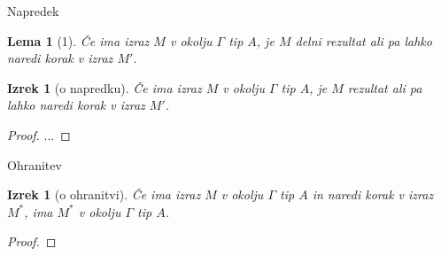 \documentclass{beamer}
\theoremstyle{definition} %
\theoremstyle{plain} %
\newtheorem{lema}[definicija]{Lema}
\newtheorem{izrek}[definicija]{Izrek}
\begin{document}
	

	
	\begin{frame}{Napredek}
		\begin{lema}[1]
			Če ima izraz $M$ v okolju $\Gamma$ tip $A$, je $M$ delni rezultat ali pa lahko naredi korak v izraz $M'$.
		\end{lema}
		
		
					
		\begin{izrek}[o napredku]
			Če ima izraz $M$ v okolju $\Gamma$ tip $A$, je $M$ rezultat ali pa lahko naredi korak v izraz $M'$.
		\end{izrek}
		
		\begin{proof}
			... 
		\end{proof}
		
	\end{frame}

	
		
	\begin{frame}{Ohranitev}
				
		\begin{izrek}[o ohranitvi]
			Če ima izraz $M$ v okolju $\Gamma$ tip $A$ in naredi korak v izraz $M^*$, ima $M^*$ v okolju $\Gamma$ tip $A$.
		\end{izrek}
		
		\begin{proof}
		\end{proof}
		
	\end{frame}
\end{document}
